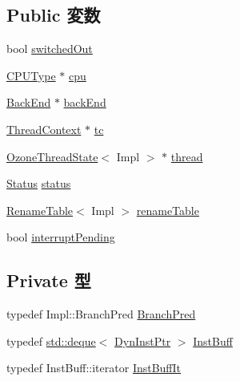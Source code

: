\subsection*{Public 変数}
\begin{DoxyCompactItemize}
\item 
bool \hyperlink{classFrontEnd_a1aee6db9bfb75cf02e38a82e5d02847f}{switchedOut}
\item 
\hyperlink{classFrontEnd_ad0cc927c8534eaba1d99c29b2942311f}{CPUType} $\ast$ \hyperlink{classFrontEnd_ab2e5cd9c988b4f91a1b9040f14fbd0f9}{cpu}
\item 
\hyperlink{classBackEnd}{BackEnd} $\ast$ \hyperlink{classFrontEnd_af59b0af2f4e41305c729ac6e36fd7803}{backEnd}
\item 
\hyperlink{classThreadContext}{ThreadContext} $\ast$ \hyperlink{classFrontEnd_a4455a4759e69e5ebe68ae7298cbcc37d}{tc}
\item 
\hyperlink{structOzoneThreadState}{OzoneThreadState}$<$ Impl $>$ $\ast$ \hyperlink{classFrontEnd_ab6f834310107fd693035eba2eeca583f}{thread}
\item 
\hyperlink{classFrontEnd_a67a0db04d321a74b7e7fcfd3f1a3f70b}{Status} \hyperlink{classFrontEnd_ae29aa2d4ae440022daaed1107eb306b3}{status}
\item 
\hyperlink{classRenameTable}{RenameTable}$<$ Impl $>$ \hyperlink{classFrontEnd_af8d3f859e7c0dd9408ba99de6f415616}{renameTable}
\item 
bool \hyperlink{classFrontEnd_a310de3efc6b60f47de5792d2b00d0840}{interruptPending}
\end{DoxyCompactItemize}
\subsection*{Private 型}
\begin{DoxyCompactItemize}
\item 
typedef Impl::BranchPred \hyperlink{classFrontEnd_a25460b96f0b4cf1681e2c540a7a329eb}{BranchPred}
\item 
typedef \hyperlink{classstd_1_1deque}{std::deque}$<$ \hyperlink{classFrontEnd_a028ce10889c5f6450239d9e9a7347976}{DynInstPtr} $>$ \hyperlink{classFrontEnd_aa99c789f993c7211a0d79f7b05cf887b}{InstBuff}
\item 
typedef InstBuff::iterator \hyperlink{classFrontEnd_a44b16657794dcb6775f2ef42b3e37b22}{InstBuffIt}
\end{DoxyCompactItemize}
